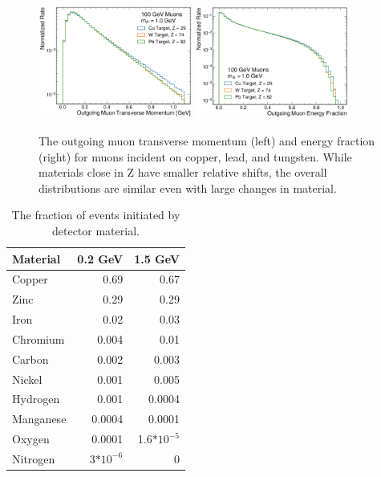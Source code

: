 \begin{figure}[!htbp]
    \centering
    \includegraphics[width=0.45\textwidth]{figures/muon_material_comp_pt.pdf}
    \hspace{0.01\textwidth}
    \includegraphics[width=0.45\textwidth]{figures/muon_material_comp_efrac.pdf}
    \caption[
        Material dependence of \dbrem kinematics.
    ]{
        The outgoing muon transverse momentum (left) and energy fraction (right) for muons incident on copper, lead, and tungsten. While materials close in Z have smaller relative shifts, the overall distributions are similar even with large changes in material. 
    }
    \label{fig:dbrem_material}
\end{figure}

\begin{table}[ht]
    \centering
    \begin{center}
        \begin{tabular}{@{}l rr@{}}
            \toprule
            Material & 0.2 GeV & 1.5 GeV\\
            \midrule
            Copper&0.69&0.67\\
            Zinc&0.29&0.29\\
            Iron&0.02&0.03\\
            Chromium&0.004&0.01\\
            Carbon&0.002&0.003\\
            Nickel&0.001&0.005\\
            Hydrogen&0.001&0.0004\\
            Manganese&0.0004&0.0001\\
            Oxygen&0.0001&1.6$*10^{-5}$\\
            Nitrogen&3$*10^{-6}$&0\\
            \bottomrule
        \end{tabular}
        \caption{
            The fraction of \dbrem events initiated by detector material.
        }
        \label{table:dbrem_material}
    \end{center}
\end{table}
    
